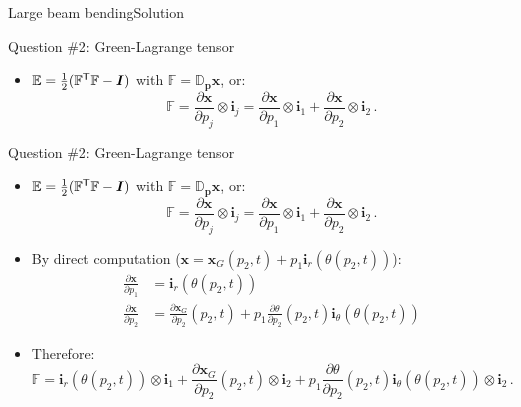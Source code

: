\documentclass{beamer}
\newcommand{\demi}{\frac{1}{2}}
\newcommand{\itr}{{\sf T}}
\newcommand{\Id}{{\boldsymbol I}}
\newcommand{\xj}{x}
\newcommand{\xv}{{\boldsymbol\xj}}
\newcommand{\Grad}{{\mathbb D}}
\renewcommand{\ij}{i}
\newcommand{\pj}{p}
\newcommand{\iv}{{\boldsymbol\ij}}
\newcommand{\pv}{{\boldsymbol\pj}}
\newcommand{\Fp}{{\mathbb F}}
\newcommand{\GreenLj}{E}
\newcommand{\GreenL}{{\mathbb\GreenLj}}
\begin{document}
\begin{frame}{Large beam bending}{Solution}

\begin{overprint}

\begin{exampleblock}{Question \#2: Green-Lagrange tensor}
\begin{itemize}
\item $\GreenL=\demi(\Fp^\itr\Fp-\Id)$ with $\Fp=\Grad_\pv\xv$, or:
\begin{displaymath}
\Fp=\frac{\partial\xv}{\partial\pj_j}\otimes\iv_j=\frac{\partial\xv}{\partial\pj_1}\otimes\iv_1+\frac{\partial\xv}{\partial\pj_2}\otimes\iv_2\,.
\end{displaymath}
\end{itemize}
\end{exampleblock}

\vskip-20pt
\begin{exampleblock}{Question \#2: Green-Lagrange tensor}
\begin{itemize}
\item $\GreenL=\demi(\Fp^\itr\Fp-\Id)$ with $\Fp=\Grad_\pv\xv$, or:
{\footnotesize
\begin{displaymath}
\Fp=\frac{\partial\xv}{\partial\pj_j}\otimes\iv_j=\frac{\partial\xv}{\partial\pj_1}\otimes\iv_1+\frac{\partial\xv}{\partial\pj_2}\otimes\iv_2\,.
\end{displaymath}}
\item By direct computation ($\xv=\xv_G(\pj_2,t)+\pj_1\iv_r(\theta(\pj_2,t))$):
{\footnotesize
\begin{displaymath}
\begin{split}
\frac{\partial\xv}{\partial\pj_1} &=\iv_r(\theta(\pj_2,t)) \\
\frac{\partial\xv}{\partial\pj_2} &=\frac{\partial\xv_G}{\partial\pj_2}(\pj_2,t)+\pj_1\frac{\partial\theta}{\partial\pj_2}(\pj_2,t)\iv_\theta(\theta(\pj_2,t))
\end{split}
\end{displaymath}}
\item Therefore:
{\footnotesize
\begin{displaymath}
\Fp=\iv_r(\theta(\pj_2,t))\otimes\iv_1+\frac{\partial\xv_G}{\partial\pj_2}(\pj_2,t)\otimes\iv_2+\pj_1\frac{\partial\theta}{\partial\pj_2}(\pj_2,t)\iv_\theta(\theta(\pj_2,t))\otimes\iv_2\,.
\end{displaymath}}
\end{itemize}
\end{exampleblock}


\end{overprint}
\end{frame}
\end{document}
